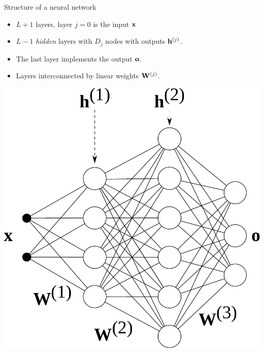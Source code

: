 \documentclass{beamer}
\begin{document}
\begin{frame}{Structure of a neural network}
\begin{multicols}{2}

    \begin{itemize}
\item  $L+1$ layers, layer $j=0$ is the input ${{\bf x}}$ 
\item $L-1$ {\it hidden} layers with $D_j$ nodes with outputs ${\bf h}^{(j)}$. 
\item The last layer implements the output ${\bf o}$. 
\item Layers interconnected by linear weights  ${\bf W}^{(j)}$. 
\end{itemize}





\centering
\includegraphics[scale=0.35]{pics/f4.1.pdf}

\end{multicols}


\end{frame} 
\end{document}
